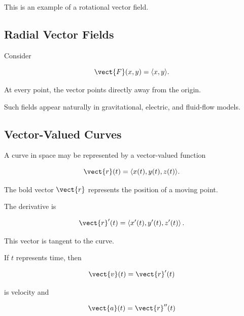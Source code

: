 This is an example of a rotational vector field.

\subsection{Radial Vector Fields}
\label{subsec:radial-vector-fields}

Consider

\[ \vect{F}(x,y)=\langle x,y\rangle. \]

At every point, the vector points directly away from the origin.

\begin{center}
\end{center}

Such fields appear naturally in gravitational, electric, and fluid-flow
models.

\subsection{Vector-Valued Curves}
\label{subsec:vector-valued-curves}

A curve in space may be represented by a vector-valued function

\[ \vect{r}(t)=\langle x(t),y(t),z(t)\rangle. \]

The bold vector \(\vect{r}\) represents the position of a moving point.

The derivative is

\[ \vect{r}'(t)=\left\langle x'(t),y'(t),z'(t)\right\rangle. \]

This vector is tangent to the curve.

If \(t\) represents time, then

\[ \vect{v}(t)=\vect{r}'(t) \]

is velocity and

\[ \vect{a}(t)=\vect{r}''(t) \]

